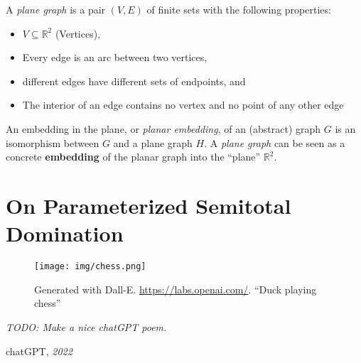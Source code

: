 \begin{graphclass}[Planar]

A \textit{plane graph} is a pair $(V,E)$ of finite sets with the following properties:

\begin{itemize}
    \item $V \subseteq \mathbb{R}^2$ (Vertices),
    \vspace{-2mm}
    \item Every edge is an arc between two vertices, 
    \vspace{-2mm}
    \item different edges have different sets of endpoints, and
    \vspace{-2mm}
    \item The interior of an edge contains no vertex and no point of any other edge
\end{itemize}

An embedding in the plane, or \textit{planar embedding}, of an (abstract) graph $G$ is an isomorphism between $G$ and a plane graph $H$. A \textit{plane graph} can be seen as a concrete \textbf{embedding} of the planar graph into the ``plane'' $\mathbb{R}^2$.

\end{graphclass}



\chapter{On Parameterized Semitotal Domination}\label{ch:semitotal-domination}

\vspace*{-50pt}

\begin{figure}[ht]
        \texttt{[image: img/chess.png]}
        \captionsetup{textformat=empty,labelformat=blank}
        \caption{Generated with Dall-E. \url{https://labs.openai.com/}. ``Duck playing chess''}
\end{figure}

\epigraph{\itshape TODO: Make a nice chatGPT poem.}{chatGPT, \textit{2022}}

